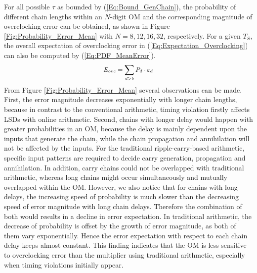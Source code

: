 \documentclass{acm_proc_article-sp}
\begin{document}
\vspace{-1ex}
For all possible $\tau$ as bounded by (\ref{Eq:Bound_GenChain}), the probability of different chain lengths within an $N$-digit OM and the corresponding magnitude of overclocking error can be obtained, as shown in Figure \ref{Fig:Probability_Error_Mean} with $N=8,12,16,32$, respectively. For a given $T_S$, the overall expectation of overclocking error in (\ref{Eq:Expectation_Overclocking}) can also be computed by (\ref{Eq:PDF_MeanError}).
%
\begin{eqnarray}\label{Eq:PDF_MeanError}
\small
  E_{ovc}=\sum_{d>b}P_d\cdot\varepsilon_d
\normalsize
\end{eqnarray}
%
From Figure \ref{Fig:Probability_Error_Mean} several observations can be made. First, the error magnitude decreases exponentially with longer chain lengths, because in contrast to the conventional arithmetic, timing violation firstly affects LSDs with online arithmetic. Second, chains with longer delay would happen with greater probabilities in an OM, because the delay is mainly dependent upon the inputs that generate the chain, while the chain propagation and annihilation will not be affected by the inputs. For the traditional ripple-carry-based arithmetic, specific input patterns are required to decide carry generation, propagation and annihilation. In addition, carry chains could not be overlapped with traditional arithmetic, whereas long chains might occur simultaneously and mutually overlapped within the OM. However, we also notice that for chains with long delays, the increasing speed of probability is much slower than the decreasing speed of error magnitude with long chain delays. Therefore the combination of both would results in a decline in error expectation. In traditional arithmetic, the decrease of probability is offset by the growth of error magnitude, as both of them vary exponentially. Hence the error expectation with respect to each chain delay keeps almost constant. This finding indicates that the OM is less sensitive to overclocking error than the multiplier using traditional arithmetic, especially when timing violations initially appear.
\end{document}
